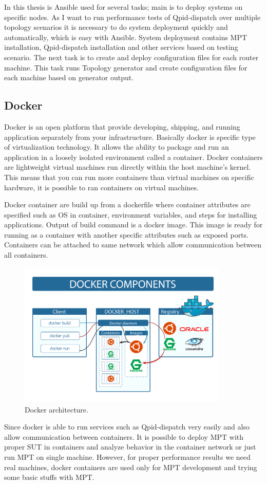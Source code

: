In this thesis is Ansible used for several tasks; main is to deploy systems on specific nodes. As I want to run performance tests of Qpid-dispatch over multiple topology scenarios it is necessary to do system deployment quickly and automatically, which is easy with Ansible. System deployment contains MPT installation, Qpid-dispatch installation and other services based on testing scenario. The next task is to create and deploy configuration files for each router machine. This task runs Topology generator and create configuration files for each machine based on generator output.


\subsection{Docker}
Docker \cite{Docker} is an open platform that provide developing, shipping, and running application separately from your infrastructure. Basically docker is specific type of virtualization technology. It allows the ability to package and run an application in a loosely isolated environment called a container. Docker containers are lightweight virtual machines run directly within the host machine's kernel. This means that you can run more containers than virtual machines on specific hardware, it is possible to ran containers on virtual machines.

Docker container are build up from a dockerfile where container attributes are specified such as OS in container, environment variables, and steps for installing applications. Output of build command is a docker image. This image is ready for running as a container with another specific attributes such as exposed ports. Containers can be attached to same network which allow communication between all containers.

\begin{figure}[H]
  \centering
  \includegraphics[width=10cm]{obrazky-figures/docker.png}
  \caption{Docker architecture. }
  \label{fig:ansible_architecture}
\end{figure}


Since docker is able to run services such as Qpid-dispatch very easily and also allow communication between containers. It is possible to deploy MPT with proper SUT in containers and analyze behavior in the container network or just run MPT on single machine. However, for proper performance results we need real machines, docker containers are used only for MPT development and trying some basic stuffs with MPT.
